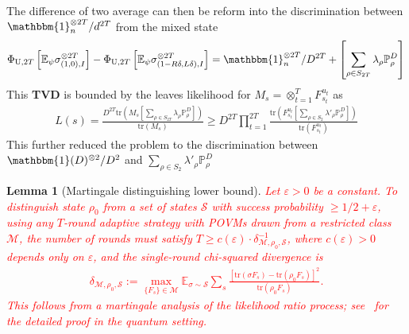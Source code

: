 \documentclass[aps,%
twocolumn,%
floatfix,%
pra,%
amsfonts,%
groupedaddress,%
superscriptaddress]{revtex4-2}%
\newtheorem{lemma}{Lemma}
\newcommand{\1}{\mathbbm{1}}
\begin{document}
The difference of two average can then be reform into the discrimination between $\1_{n}^{\otimes 2T}/d^{2T}$ from the mixed state
\begin{align}
    \Phi_{\mathrm{U},2T}\left[ \mathbb{E}_{\psi}\sigma_{(1,0),I}^{\otimes 2T} \right] -\Phi_{\mathrm{U},2T}\left[ \mathbb{E}_{\psi}\sigma_{(1-R\delta,L\delta),I}^{\otimes 2T} \right] =  \1_{n}^{\otimes 2T}/D^{2T} + \left[\sum_{\rho \in S_{2T}} \lambda_{\rho} \mathbb{P}_{\rho}^{D} \right]
\end{align}
This \textbf{TVD} is bounded by the leaves likelihood for $M_s = \otimes_{t =1}^{T} F_{s_t}^{u_t}$ as
\begin{align}
    L(s) = \frac{D^{2T}\mathrm{tr}\left(M_s\left[\sum_{\rho \in S_{2T}} \lambda_{\rho} \mathbb{P}_{\rho}^{D} \right]\right)}{\mathrm{tr}\left(M_s\right)} 
    \geq  D^{2T} \prod_{t = 1}^{2T} \frac{\mathrm{tr}\left(F_{s_t}^{u_t}\left[\sum_{\rho \in S_{2}} \lambda'_{\rho} \mathbb{P}_{\rho}^{D} \right]\right)}{\mathrm{tr}\left(F_{s_t}^{u_t}\right)}
\end{align}
This further reduced the problem to the discrimination between $\1(D)^{\otimes 2}/D^2$ and $\sum_{\rho \in S_{2}} \lambda'_{\rho} \mathbb{P}_{\rho}^{D} $

\begin{lemma}[Martingale distinguishing lower bound]\label{theo:mart_distinguish_lb}
    \textcolor{red}{Let $\varepsilon > 0$ be a constant. To distinguish state $\rho_0$ from a set of states $\mathcal{S}$ with success probability $\geq 1/2 + \varepsilon$, using any $T$-round adaptive strategy with POVMs drawn from a restricted class $\mathcal{M}$, the number of rounds must satisfy $T \geq c(\varepsilon) \cdot \delta_{\mathcal{M},\rho_0,\mathcal{S}}^{-1}$, where $c(\varepsilon) > 0$ depends only on $\varepsilon$, and the single-round chi-squared divergence is
    \begin{align}
        \delta_{\mathcal{M},\rho_0,\mathcal{S}} := \max_{\{F_s\} \in \mathcal{M}} \mathbb{E}_{\sigma \sim \mathcal{S}} \sum_s \frac{[\mathrm{tr}(\sigma F_s) - \mathrm{tr}(\rho_0 F_s)]^2}{\mathrm{tr}(\rho_0 F_s)}.
    \end{align}
    This follows from a martingale analysis of the likelihood ratio process; see~\cite{chen2021exponential} for the detailed proof in the quantum setting.}
\end{lemma}
\end{document}
